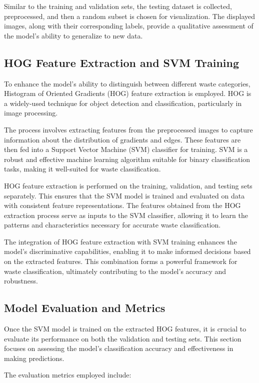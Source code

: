 \documentclass{article}
\begin{document}
Similar to the training and validation sets, the testing dataset is collected, preprocessed, and then a random subset is chosen for visualization. The displayed images, along with their corresponding labels, provide a qualitative assessment of the model's ability to generalize to new data.


\subsection{HOG Feature Extraction and SVM Training}

To enhance the model's ability to distinguish between different waste categories, Histogram of Oriented Gradients (HOG) feature extraction is employed. HOG is a widely-used technique for object detection and classification, particularly in image processing.

The process involves extracting features from the preprocessed images to capture information about the distribution of gradients and edges. These features are then fed into a Support Vector Machine (SVM) classifier for training. SVM is a robust and effective machine learning algorithm suitable for binary classification tasks, making it well-suited for waste classification.

HOG feature extraction is performed on the training, validation, and testing sets separately. This ensures that the SVM model is trained and evaluated on data with consistent feature representations. The features obtained from the HOG extraction process serve as inputs to the SVM classifier, allowing it to learn the patterns and characteristics necessary for accurate waste classification.

The integration of HOG feature extraction with SVM training enhances the model's discriminative capabilities, enabling it to make informed decisions based on the extracted features. This combination forms a powerful framework for waste classification, ultimately contributing to the model's accuracy and robustness.

\subsection{Model Evaluation and Metrics}
Once the SVM model is trained on the extracted HOG features, it is crucial to evaluate its performance on both the validation and testing sets. This section focuses on assessing the model's classification accuracy and effectiveness in making predictions.

The evaluation metrics employed include:
\end{document}
